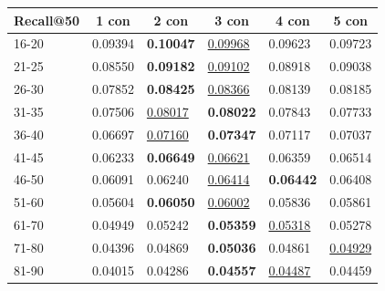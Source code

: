 \begin{table}[]
    \centering
    \begin{tabular}{|l|l|l|l|l|l|}
        \hline
        Recall@50 & \multicolumn{1}{c|}{1 con} & \multicolumn{1}{c|}{2 con} & \multicolumn{1}{c|}{3 con} & \multicolumn{1}{c|}{4 con} & \multicolumn{1}{c|}{5 con} \\ \hline
        16-20     & 0.09394                    & \textbf{0.10047}           & \underline{0.09968}        & 0.09623                    & 0.09723                    \\ \hline
        21-25     & 0.08550                    & \textbf{0.09182}           & \underline{0.09102}        & 0.08918                    & 0.09038                    \\ \hline
        26-30     & 0.07852                    & \textbf{0.08425}           & \underline{0.08366}        & 0.08139                    & 0.08185                    \\ \hline
        31-35     & 0.07506                    & \underline{0.08017}        & \textbf{0.08022}           & 0.07843                    & 0.07733                    \\ \hline
        36-40     & 0.06697                    & \underline{0.07160}        & \textbf{0.07347}           & 0.07117                    & 0.07037                    \\ \hline
        41-45     & 0.06233                    & \textbf{0.06649}           & \underline{0.06621}        & 0.06359                    & 0.06514                    \\ \hline
        46-50     & 0.06091                    & 0.06240                    & \underline{0.06414}        & \textbf{0.06442}           & 0.06408                    \\ \hline
        51-60     & 0.05604                    & \textbf{0.06050}           & \underline{0.06002}        & 0.05836                    & 0.05861                    \\ \hline
        61-70     & 0.04949                    & 0.05242                    & \textbf{0.05359}           & \underline{0.05318}        & 0.05278                    \\ \hline
        71-80     & 0.04396                    & 0.04869                    & \textbf{0.05036}           & 0.04861                    & \underline{0.04929}        \\ \hline
        81-90     & 0.04015                    & 0.04286                    & \textbf{0.04557}           & \underline{0.04487}        & 0.04459                    \\ \hline

\end{tabular}
\end{table}
